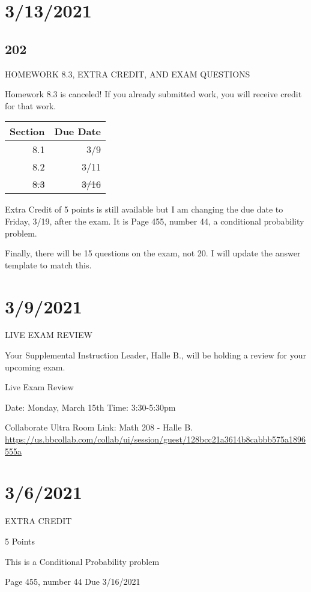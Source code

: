 \documentclass[]{article}
\begin{document}
\section*{3/13/2021}
\subsection*{202}
HOMEWORK 8.3, EXTRA CREDIT, AND EXAM QUESTIONS

Homework 8.3 is canceled! If you already submitted work, you will receive credit for that work.

\bgroup
\def\arraystretch{1.5}
\begin{tabular}{|r|r|}
	\hline
	Section & Due Date \\
	\hline
	8.1 & 3/9 \\
	\hline
	8.2 & 3/11 \\
	\hline
	\sout{8.3} & \sout{3/16} \\
	\hline
\end{tabular}
\egroup

Extra Credit of 5 points is still available but I am changing the due date to Friday, 3/19, after the exam. It is Page 455, number 44, a conditional probability problem.

Finally, there will be 15 questions on the exam, not 20. I will update the answer template to match this.



\section*{3/9/2021}
LIVE EXAM REVIEW

Your Supplemental Instruction Leader, Halle B., will be holding a review for your upcoming exam.

Live Exam Review 

Date: Monday, March 15th
Time: 3:30-5:30pm

Collaborate Ultra Room Link: Math 208 - Halle B.
\url{https://us.bbcollab.com/collab/ui/session/guest/128bcc21a3614b8cabbb575a1896555a}



\section*{3/6/2021}
EXTRA CREDIT

5 Points

This is a Conditional Probability problem

Page 455, number 44
Due 3/16/2021
	
\end{document}
